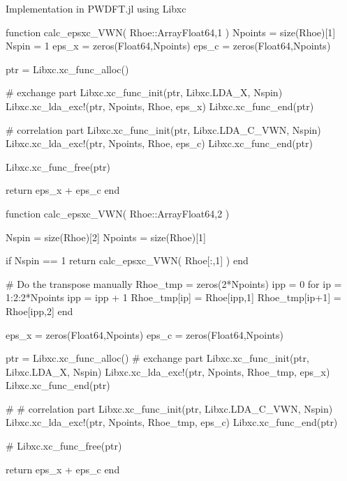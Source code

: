 Implementation in \textsf{PWDFT.jl} using Libxc

\begin{juliacode}
function calc_epsxc_VWN( Rhoe::Array{Float64,1} )
    Npoints = size(Rhoe)[1]
    Nspin = 1
    eps_x = zeros(Float64,Npoints)
    eps_c = zeros(Float64,Npoints)

    ptr = Libxc.xc_func_alloc()

    # exchange part
    Libxc.xc_func_init(ptr, Libxc.LDA_X, Nspin)
    Libxc.xc_lda_exc!(ptr, Npoints, Rhoe, eps_x)
    Libxc.xc_func_end(ptr)

    # correlation part
    Libxc.xc_func_init(ptr, Libxc.LDA_C_VWN, Nspin)
    Libxc.xc_lda_exc!(ptr, Npoints, Rhoe, eps_c)
    Libxc.xc_func_end(ptr)

    Libxc.xc_func_free(ptr)

    return eps_x + eps_c
end
\end{juliacode}


\begin{juliacode}
    function calc_epsxc_VWN( Rhoe::Array{Float64,2} )

        Nspin = size(Rhoe)[2]
        Npoints = size(Rhoe)[1]

        if Nspin == 1
            return calc_epsxc_VWN( Rhoe[:,1] )
        end

        # Do the transpose manually
        Rhoe_tmp = zeros(2*Npoints)
        ipp = 0
        for ip = 1:2:2*Npoints
            ipp = ipp + 1
            Rhoe_tmp[ip] = Rhoe[ipp,1]
            Rhoe_tmp[ip+1] = Rhoe[ipp,2]
        end


        eps_x = zeros(Float64,Npoints)
        eps_c = zeros(Float64,Npoints)

        ptr = Libxc.xc_func_alloc()
        # exchange part
        Libxc.xc_func_init(ptr, Libxc.LDA_X, Nspin)
        Libxc.xc_lda_exc!(ptr, Npoints, Rhoe_tmp, eps_x)
        Libxc.xc_func_end(ptr)

        #
        # correlation part
        Libxc.xc_func_init(ptr, Libxc.LDA_C_VWN, Nspin)
        Libxc.xc_lda_exc!(ptr, Npoints, Rhoe_tmp, eps_c)
        Libxc.xc_func_end(ptr)

        #
        Libxc.xc_func_free(ptr)

        return eps_x + eps_c
    end
\end{juliacode}
